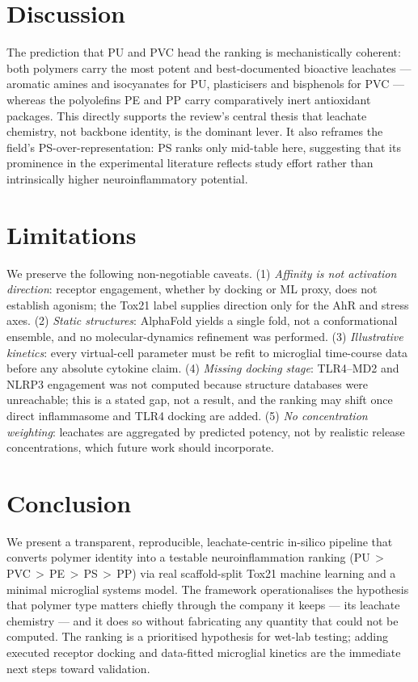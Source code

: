 \documentclass[journal]{IEEEtran}
\begin{document}
\section{Discussion}
The prediction that PU and PVC head the ranking is mechanistically coherent: both
polymers carry the most potent and best-documented bioactive leachates ---
aromatic amines and isocyanates for PU, plasticisers and bisphenols for PVC ---
whereas the polyolefins PE and PP carry comparatively inert antioxidant packages.
This directly supports the review's central thesis that leachate chemistry, not
backbone identity, is the dominant lever. It also reframes the field's
PS-over-representation: PS ranks only mid-table here, suggesting that its
prominence in the experimental literature reflects study effort rather than
intrinsically higher neuroinflammatory potential.

\section{Limitations}
We preserve the following non-negotiable caveats. (1) \emph{Affinity is not
activation direction}: receptor engagement, whether by docking or ML proxy, does
not establish agonism; the Tox21 label supplies direction only for the AhR and
stress axes. (2) \emph{Static structures}: AlphaFold yields a single fold, not a
conformational ensemble, and no molecular-dynamics refinement was performed.
(3) \emph{Illustrative kinetics}: every virtual-cell parameter must be refit to
microglial time-course data before any absolute cytokine claim. (4) \emph{Missing
docking stage}: TLR4--MD2 and NLRP3 engagement was not computed because structure
databases were unreachable; this is a stated gap, not a result, and the ranking
may shift once direct inflammasome and TLR4 docking are added. (5) \emph{No
concentration weighting}: leachates are aggregated by predicted potency, not by
realistic release concentrations, which future work should incorporate.

\section{Conclusion}
We present a transparent, reproducible, leachate-centric in-silico pipeline that
converts polymer identity into a testable neuroinflammation ranking
(PU\,$>$\,PVC\,$>$\,PE\,$>$\,PS\,$>$\,PP) via real scaffold-split Tox21 machine
learning and a minimal microglial systems model. The framework operationalises the
hypothesis that polymer type matters chiefly through the company it keeps --- its
leachate chemistry --- and it does so without fabricating any quantity that could
not be computed. The ranking is a prioritised hypothesis for wet-lab testing;
adding executed receptor docking and data-fitted microglial kinetics are the
immediate next steps toward validation.
\end{document}
